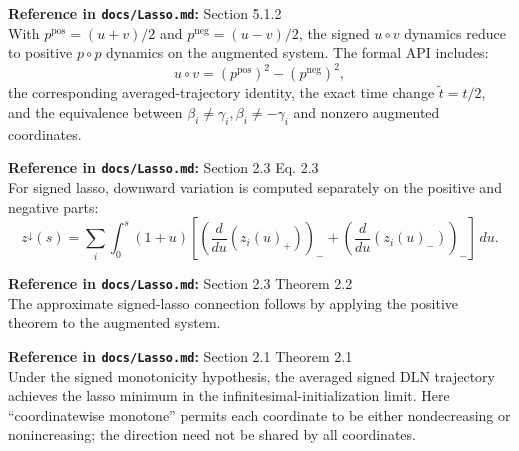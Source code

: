 \begin{proposition}\label{prop:dlnDynamicsReduction}
  \textbf{Reference in \texttt{docs/Lasso.md}:} Section 5.1.2\\
With $p^{\mathrm{pos}}=(u+v)/2$ and $p^{\mathrm{neg}}=(u-v)/2$, the signed
$u\circ v$ dynamics reduce to positive $p\circ p$ dynamics on the augmented
system.
The formal API includes:
\[
  u\circ v=(p^{\mathrm{pos}})^2-(p^{\mathrm{neg}})^2,
\]
the corresponding averaged-trajectory identity, the exact time change
\(\widetilde t=t/2\), and the equivalence between
\(\beta_i\ne\gamma_i,\beta_i\ne-\gamma_i\) and nonzero augmented coordinates.
\end{proposition}

\begin{definition}\label{def:signedZDownward}
  \textbf{Reference in \texttt{docs/Lasso.md}:} Section 2.3 Eq. 2.3\\
For signed lasso, downward variation is computed separately on the positive and
negative parts:
\[
  z^\downarrow(s)=
  \sum_i\int_0^s(1+u)
    \left[
      \left(\frac{d}{du}(z_i(u)_+)\right)_-
      +
      \left(\frac{d}{du}(z_i(u)_-)\right)_-
    \right]\,du.
\]
\end{definition}

\begin{theorem}\label{thm:lassoConnectionApprox}
  \textbf{Reference in \texttt{docs/Lasso.md}:} Section 2.3 Theorem 2.2\\
The approximate signed-lasso connection follows by applying the positive
theorem to the augmented system.
\end{theorem}

\begin{theorem}\label{thm:lassoConnectionMonotone}
  \textbf{Reference in \texttt{docs/Lasso.md}:} Section 2.1 Theorem 2.1\\
Under the signed monotonicity hypothesis, the averaged signed DLN trajectory
achieves the lasso minimum in the infinitesimal-initialization limit.
Here ``coordinatewise monotone'' permits each coordinate to be either
nondecreasing or nonincreasing; the direction need not be shared by all
coordinates.
\end{theorem}

